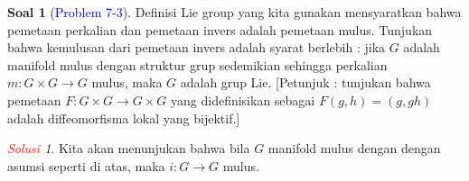 \documentclass[11pt]{article}
\theoremstyle{definition}
\newtheorem*{problem}{Soal}
\theoremstyle{remark}
\newtheorem*{solution}{\textcolor{red}{Solusi}}
\begin{document}
\begin{problem}[\textcolor{blue}{Problem 7-3}]
Definisi Lie group yang kita gunakan mensyaratkan bahwa pemetaan perkalian dan pemetaan invers adalah pemetaan mulus. Tunjukan bahwa kemulusan dari pemetaan invers adalah syarat berlebih : jika $G$ adalah manifold mulus dengan struktur grup sedemikian sehingga perkalian $m : G \times G \to G$ mulus, maka $G$ adalah grup Lie. [Petunjuk : tunjukan bahwa pemetaan $F : G \times G \to G \times G$ yang didefinisikan sebagai $F(g,h) = (g,gh)$ adalah diffeomorfisma lokal yang bijektif.]
\end{problem}
\begin{solution}
Kita akan menunjukan bahwa bila $G$ manifold mulus dengan dengan asumsi seperti di atas, maka $i : G \to G$ mulus.\newline

\noindent{}\newline


\end{solution}
\end{document}
